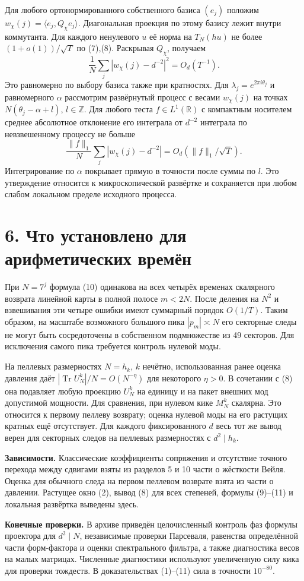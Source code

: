 \documentclass[11pt,a4paper]{article}
\newcommand{\Tr}{\operatorname{Tr}}
\newcommand{\R}{\mathbb R}
\newcommand{\Z}{\mathbb Z}
\newcommand{\sect}[1]{\section*{\sffamily\color{ink}#1}}
\begin{document}
Для любого ортонормированного собственного базиса $(e_j)$ положим $w_\chi(j)=\langle e_j,Q_\chi e_j\rangle$. Диагональная проекция по этому базису лежит внутри коммутанта. Для каждого ненулевого $u$ её норма на $T_N(hu)$ не более $(1+o(1))/\sqrt T$ по (7),(8). Раскрывая $Q_\chi$, получаем
\[
           \frac1N\sum_j |w_\chi(j)-d^{-2}|^2=O_d(T^{-1}).            \tag{11}
\]
Это равномерно по выбору базиса также при кратностях. Для $\lambda_j=e^{2\pi i\theta_j}$ и равномерного $\alpha$ рассмотрим развёрнутый процесс с весами $w_\chi(j)$ на точках $N(\theta_j-\alpha+l)$, $l\in\Z$. Для любого теста $f\in L^1(\R)$ с компактным носителем среднее абсолютное отклонение его интеграла от $d^{-2}$ интеграла по невзвешенному процессу не больше
\[
       \frac{\|f\|_1}{N}\sum_j |w_\chi(j)-d^{-2}|
                             = O_d(\|f\|_1/\sqrt T).
\]
Интегрирование по $\alpha$ покрывает прямую в точности после суммы по $l$. Это утверждение относится к микроскопической развёртке и сохраняется при любом слабом локальном пределе исходного процесса.
\newpage
\sect{6. Что установлено для арифметических времён}
При $N=7^j$ формула (10) одинакова на всех четырёх временах скалярного возврата линейной карты в полной полосе $m<2N$. После деления на $N^2$ и взвешивания эти четыре ошибки имеют суммарный порядок $O(1/T)$. Таким образом, на масштабе возможного большого пика $|p_m|\asymp N$ его секторные следы не могут быть сосредоточены в собственном подмножестве из 49 секторов. Для исключения самого пика требуется контроль нулевой моды.

На пеллевых размерностях $N=h_k$, $k$ нечётно, использованная ранее оценка давления даёт $|\Tr U_N^k|/N=O(N^{-\eta})$ для некоторого $\eta>0$. В сочетании с (8) она подавляет любую проекцию $U_N^k$ на единицу и на пакет внешних мод допустимой мощности. Для сравнения, при нулевом кике $M_N^k$ скалярна. Это относится к первому пеллеву возврату; оценка нулевой моды на его растущих кратных ещё отсутствует. Для каждого фиксированного $d$ весь тот же вывод верен для секторных следов на пеллевых размерностях с $d^2\mid h_k$.

\textbf{Зависимости.} Классические коэффициенты сопряжения и отсутствие точного перехода между сдвигами взяты из разделов 5 и 10 части о жёсткости Вейля. Оценка для обычного следа на первом пеллевом возврате взята из части о давлении. Растущее окно (2), вывод (8) для всех степеней, формулы (9)--(11) и локальная развёртка выведены здесь.

\textbf{Конечные проверки.} В архиве приведён целочисленный контроль фаз формулы проектора для $d^2\mid N$, независимые проверки Парсеваля, равенства определённой части форм-фактора и оценки спектрального фильтра, а также диагностика весов на малых матрицах. Численные диагностики используют увеличенную силу кика для проверки тождеств. В доказательствах (1)--(11) сила в точности $10^{-80}$.
\end{document}
